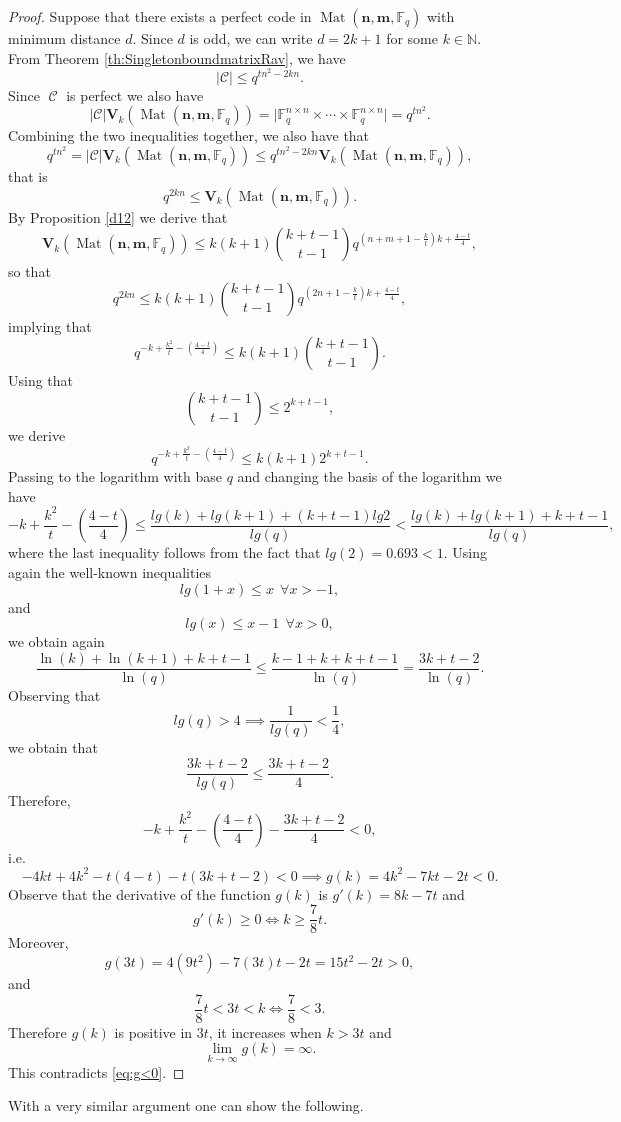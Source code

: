 \documentclass[11pt]{amsart}
\DeclareMathOperator{\C}{\mathcal{C}}
\DeclareMathOperator{\Mat}{Mat}
\theoremstyle{definition}
\newcommand{\F}{{\mathbb F}}
\newcommand{\NN}{{\mathbb N}}
\newcommand{\bfn}{\mathbf {n}}
\newcommand{\bfm}{\mathbf {m}}
\newcommand{\spacmn}{\Mat(\bfn,\bfm,\F_q)}
\begin{document}
\begin{proof}
Suppose that there exists a perfect code in $\spacmn$ with minimum distance $d$.
Since $d$ is odd, we can write $d=2k+1$ for some $k \in \NN$.
From Theorem \ref{th:SingletonboundmatrixRav}, we have
\[
\lvert \mathcal{C}\rvert\leq q^{tn^2-2kn}.
\]
Since $\C$ is perfect we also have
\[
\lvert \mathcal{C}\rvert \mathbf{V}_k(\spacmn)=\lvert\mathbb{F}_q^{n\times n}\times\cdots\times\mathbb{F}_q^{n\times n}\rvert=q^{tn^2}.
\]
Combining the two inequalities together, we also have that
\[
q^{tn^2}=\lvert\mathcal{C}\rvert \mathbf{V}_k(\spacmn)\leq q^{tn^2-2kn}\mathbf{V}_k(\spacmn),
\]
that is
\[
q^{2kn}\leq \mathbf{V}_k(\spacmn).
\]
By Proposition \ref{d12} we derive that
\[
\mathbf{V}_k(\spacmn)\leq k(k+1)\binom{k+t-1}{t-1}q^{(n+m+1-\frac{k}{t})k+\frac{4-t}{4}},
\]
so that
\[
q^{2kn}\leq k(k+1)\binom{k+t-1}{t-1}q^{(2n+1-\frac{k}{t})k+\frac{4-t}{4}},
\]
implying that
\[
q^{-k+\frac{k^2}{t}-(\frac{4-t}{4})}\leq k(k+1)\binom{k+t-1}{t-1}.
\]
Using that
\[
\binom{k+t-1}{t-1}\leq 2^{k+t-1},
\]
we derive 
\[
q^{-k+\frac{k^2}{t}-(\frac{4-t}{4})}\leq k(k+1)2^{k+t-1}.
\]
Passing to the logarithm with base $q$ and changing the basis of the logarithm we have
\[
-k+\frac{k^2}{t}-\left(\frac{4-t}{4}\right)\leq \frac{lg(k)+lg(k+1)+(k+t-1)lg2}{lg(q)}<\frac{lg(k)+lg(k+1)+k+t-1}{lg(q)},
\]
where the last inequality follows from the fact that $lg(2)=0.693<1$.
Using again the well-known inequalities
\[
lg(1+x)\leq x \ \ \forall x>-1,
\]
and
\[
lg(x)\leq x-1 \ \ \forall x>0,
\]
we obtain again
\[
\frac{\ln(k)+\ln(k+1)+k+t-1}{\ln(q)}\leq \frac{k-1+k+k+t-1}{\ln(q)}=\frac{3k+t-2}{\ln(q)}.
\]
Observing that
\[
lg(q)>4\implies \frac{1}{lg(q)}<\frac{1}{4},
\]
we obtain that
\[
\frac{3k+t-2}{lg(q)}\leq\frac{3k+t-2}{4}.
\]
Therefore,
\[
-k+\frac{k^2}{t}-\left(\frac{4-t}{4}\right)-\frac{3k+t-2}{4}<0,
\]
i.e.
\begin{equation}\label{eq:g<0}
-4kt+4k^2-t(4-t)-t(3k+t-2)<0\implies g(k)=4k^2-7kt-2t<0.
\end{equation}
Observe that the derivative of the function $g(k)$ is $g'(k)=8k-7t$ and 
\[
g'(k)\geq0\iff k\geq \frac{7}{8}t.
\]
Moreover,
\[
g(3t)=4(9t^2)-7(3t)t-2t=15t^2-2t>0,
\]
and
\[
\frac{7}{8}t<3t<k\iff \frac{7}{8}<3.
\]
Therefore $g(k)$ is positive in $3t$, it increases when $k>3t$ and
\[
\lim\limits_{k\to\infty}g(k)=\infty.
\]
This contradicts \eqref{eq:g<0}.
\end{proof}

With a very similar argument one can show the following.
\end{document}
